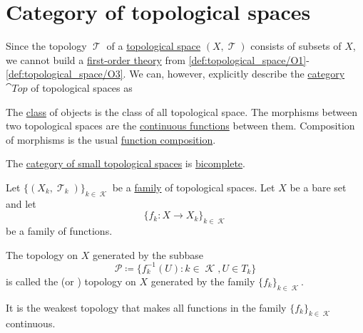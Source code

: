 \section{Category of topological spaces}\label{sec:category_of_topological_spaces}

\begin{definition}\label{def:category_of_small_topological_spaces}
  Since the topology \( \mscrT \) of a \hyperref[def:topological_space]{topological space} \( (X, \mscrT) \) consists of subsets of \( X \), we cannot build a \hyperref[def:fol_theory]{first-order theory} from \ref{def:topological_space/O1}-\ref{def:topological_space/O3}. We can, however, explicitly describe the \hyperref[def:category]{category} \( \cat{Top} \) of topological spaces as
  \begin{refenum}
     The \hyperref[def:set]{class} of objects is the class of all topological space.
     The morphisms between two topological spaces are the \hyperref[def:global_continuity]{continuous functions} between them.
     Composition of morphisms is the usual \hyperref[def:set_valued_function/composition]{function composition}.
  \end{refenum}
\end{definition}

\begin{proposition}\label{thm:category_of_small_topological_spaces_is_bicomplete}
  The \hyperref[def:category_of_small_topological_spaces]{category of small topological spaces} is \hyperref[def:bicomplete_category]{bicomplete}.
\end{proposition}

\begin{definition}\label{def:initial_topology}
  Let \( \{ (X_k, \mscrT_k) \}_{k \in \mscrK} \) be a \hyperref[def:indexed_family]{family} of topological spaces. Let \( X \) be a bare set and let
  \begin{equation*}
    \{ f_k: X \to X_k \}_{k \in \mscrK}
  \end{equation*}
  be a family of functions.

  The topology on \( X \) generated by the subbase
  \begin{equation*}
    \mathcal{P} \coloneqq \{ f_k^{-1}(U) \colon k \in \mscrK, U \in T_k \}
  \end{equation*}
  is called the  (or ) topology on \( X \) generated by the family \( \{ f_k \}_{k \in \mscrK} \).

  It is the weakest topology that makes all functions in the family \( \{ f_k \}_{k \in \mscrK} \) continuous.
\end{definition}

